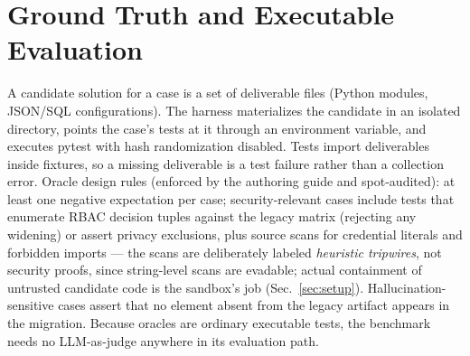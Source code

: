 \documentclass[journal]{IEEEtran}
\begin{document}
\section{Ground Truth and Executable Evaluation}
\label{sec:oracles}
A candidate solution for a case is a set of deliverable files (Python modules, JSON/SQL
configurations). The harness materializes the candidate in an isolated directory, points the
case's tests at it through an environment variable, and executes pytest with hash
randomization disabled. Tests import deliverables inside fixtures, so a missing deliverable is
a test failure rather than a collection error. Oracle design rules (enforced by the authoring
guide and spot-audited): at least one negative expectation per case; security-relevant cases
include tests that enumerate RBAC decision tuples against the legacy matrix (rejecting any
widening) or assert privacy exclusions, plus source scans for credential literals and
forbidden imports --- the scans are deliberately labeled \emph{heuristic tripwires}, not
security proofs, since string-level scans are evadable; actual containment of untrusted
candidate code is the sandbox's job (Sec.~\ref{sec:setup}). Hallucination-sensitive cases
assert that no element absent from the legacy artifact appears in the migration. Because
oracles are ordinary executable tests, the benchmark needs no LLM-as-judge anywhere in its
evaluation path.
\end{document}

